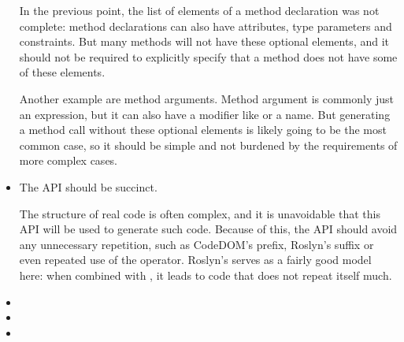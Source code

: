 \begin{itemize}
In the previous point, the list of elements of a method declaration was not complete: method declarations can also have attributes, type parameters and constraints. But many methods will not have these optional elements, and it should not be required to explicitly specify that a method does not have some of these elements.

Another example are method arguments. Method argument is commonly just an expression, but it can also have a modifier like  or a name. But generating a method call without these optional elements is likely going to be the most common case, so it should be simple and not burdened by the requirements of more complex cases.

\item The \ac{API} should be succinct.

The structure of real code is often complex, and it is unavoidable that this \ac{API} will be used to generate such code. Because of this, the \ac{API} should avoid any unnecessary repetition, such as \ac{CodeDOM}'s  prefix, Roslyn's  suffix or even repeated use of the  operator. Roslyn's  serves as a fairly good model here: when combined with , it leads to code that does not repeat itself much.

\item {}
\item {}
\item {}
\end{itemize}